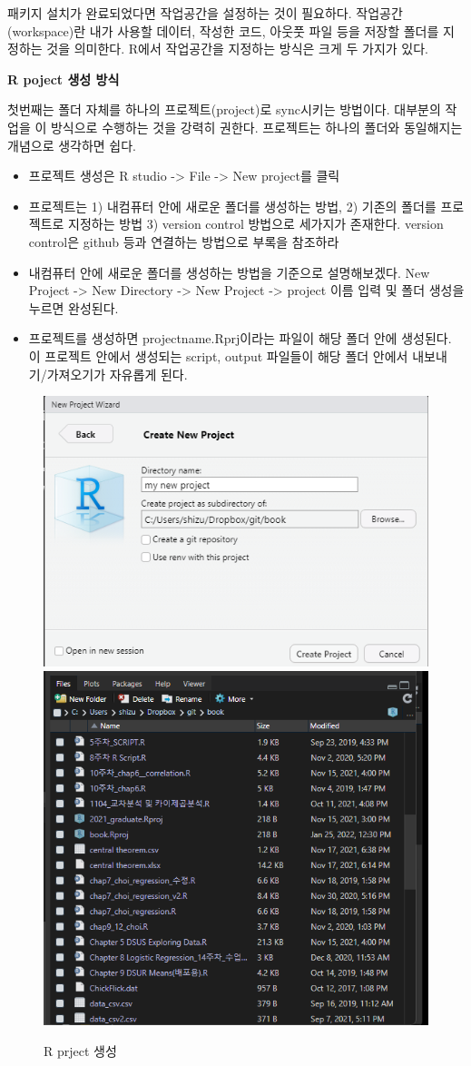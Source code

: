 \documentclass[
]{book}
\providecommand{\tightlist}{%
  \setlength{\itemsep}{0pt}\setlength{\parskip}{0pt}}
\theoremstyle{definition}
\theoremstyle{definition}
\theoremstyle{definition}
\theoremstyle{definition}
\theoremstyle{remark}
\begin{document}
패키지 설치가 완료되었다면 작업공간을 설정하는 것이 필요하다. 작업공간(workspace)란 내가 사용할 데이터, 작성한 코드, 아웃풋 파일 등을 저장할 폴더를 지정하는 것을 의미한다. R에서 작업공간을 지정하는 방식은 크게 두 가지가 있다.

\textbf{R poject 생성 방식}

첫번째는 폴더 자체를 하나의 프로젝트(project)로 sync시키는 방법이다. 대부분의 작업을 이 방식으로 수행하는 것을 강력히 권한다. 프로젝트는 하나의 폴더와 동일해지는 개념으로 생각하면 쉽다.

\begin{itemize}
\tightlist
\item
  프로젝트 생성은 R studio -\textgreater{} File -\textgreater{} New project를 클릭
\item
  프로젝트는 1) 내컴퓨터 안에 새로운 폴더를 생성하는 방법, 2) 기존의 폴더를 프로젝트로 지정하는 방법 3) version control 방법으로 세가지가 존재한다. version control은 github 등과 연결하는 방법으로 부록을 참조하라
\item
  내컴퓨터 안에 새로운 폴더를 생성하는 방법을 기준으로 설명해보겠다. New Project -\textgreater{} New Directory -\textgreater{} New Project -\textgreater{} project 이름 입력 및 폴더 생성을 누르면 완성된다.
\item
  프로젝트를 생성하면 projectname.Rprj이라는 파일이 해당 폴더 안에 생성된다. 이 프로젝트 안에서 생성되는 script, output 파일들이 해당 폴더 안에서 내보내기/가져오기가 자유롭게 된다.
\end{itemize}

\begin{figure}
\includegraphics[width=0.4\linewidth]{images/project3} \includegraphics[width=0.4\linewidth]{images/project4} \caption{R prject 생성}\label{fig:unnamed-chunk-19}
\end{figure}
\end{document}
